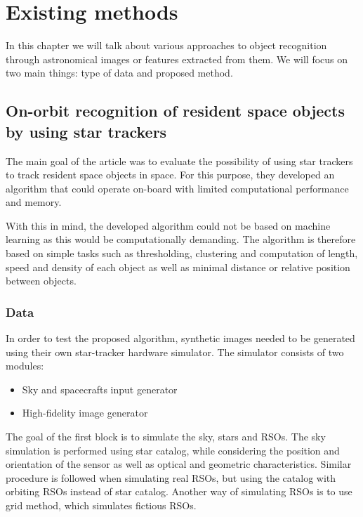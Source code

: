 \section{Existing methods}

In this chapter we will talk about various approaches to object recognition through astronomical images or features extracted from them. We will focus on two main things: type of data and proposed method. 

\subsection{On-orbit recognition of resident space objects by using star trackers}
The main goal of the article \cite{SPILLER2020478} was to evaluate the possibility of using star trackers to track resident space objects in space. For this purpose, they developed an algorithm that could operate on-board with limited computational performance and memory.

With this in mind, the developed algorithm could not be based on machine learning as this would be computationally demanding. The algorithm is therefore based on simple tasks such as thresholding, clustering and computation of length, speed and density of each object as well as minimal distance or relative position between objects. 

\subsubsection{Data}
In order to test the proposed algorithm, synthetic images needed to be generated using their own star-tracker hardware simulator. 
The simulator consists of two modules:

\begin{itemize}
    \item Sky and spacecrafts input generator
    \item High-fidelity image generator
\end{itemize}

The goal of the first block is to simulate the sky, stars and RSOs. The sky simulation is performed using star catalog, while considering the position and orientation of the sensor as well as optical and geometric characteristics. Similar procedure is followed when simulating real RSOs, but using the catalog with orbiting RSOs instead of star catalog. Another way of simulating RSOs is to use grid method, which simulates fictious RSOs. %

